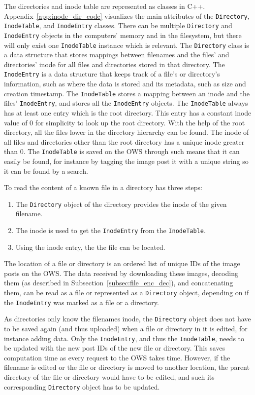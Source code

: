 The directories and inode table are represented as classes in C++. Appendix~\ref{app:inode_dir_code} visualizes the main attributes of the \texttt{Directory}, \texttt{InodeTable}, and \texttt{InodeEntry} classes. There can be multiple \texttt{Directory} and \texttt{InodeEntry} objects in the computers' memory and in the filesystem, but there will only exist one \texttt{InodeTable} instance which is relevant. The \texttt{Directory} class is a data structure that stores mappings between filenames and the files' and directories' inode for all files and directories stored in that directory. The \texttt{InodeEntry} is a data structure that keeps track of a file's or directory's information, such as where the data is stored and its metadata, such as size and creation timestamp. The \texttt{InodeTable} stores a mapping between an inode and the files' \texttt{InodeEntry}, and stores all the \texttt{InodeEntry} objects. The \texttt{InodeTable} always has at least one entry which is the root directory. This entry has a constant inode value of 0 for simplicity to look up the root directory. With the help of the root directory, all the files lower in the directory hierarchy can be found. The inode of all files and directories other than the root directory has a unique inode greater than 0. The \texttt{InodeTable} is saved on the OWS through such means that it can easily be found, for instance by tagging the image post it with a unique string so it can be found by a search.

To read the content of a known file in a directory has three steps:
\begin{enumerate}
	\item The \texttt{Directory} object of the directory provides the inode of the given filename.
	\item The inode is used to get the \texttt{InodeEntry} from the \texttt{InodeTable}.
	\item Using the inode entry, the the file can be located.
\end{enumerate}
The location of a file or directory is an ordered list of unique IDs of the image posts on the OWS. The data received by downloading these images, decoding them (as described in Subsection~\ref{subsec:file_enc_dec}), and concatenating them, can be read as a file or represented as a \texttt{Directory} object, depending on if the \texttt{InodeEntry} was marked as a file or a directory. 

As directories only know the filenames inode, the \texttt{Directory} object does not have to be saved again (and thus uploaded) when a file or directory in it is edited, for instance adding data. Only the \texttt{InodeEntry}, and thus the \texttt{InodeTable}, needs to be updated with the new post IDs of the new file or directory. This saves computation time as every request to the OWS takes time. However, if the filename is edited or the file or directory is moved to another location, the parent directory of the file or directory would have to be edited, and such its corresponding \texttt{Directory} object has to be updated.

